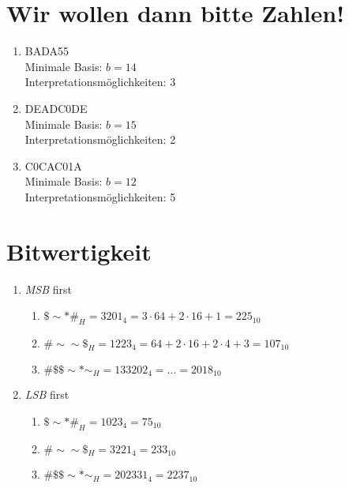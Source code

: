 \documentclass[a4paper]{article}
\begin{document}
\section{Wir wollen dann bitte Zahlen!}
\begin{enumerate}[label=\alph*)]
	\item BADA55 \\
	Minimale Basis:  $b = 14$ \\
	Interpretationsmöglichkeiten: 3


	\item DEADC0DE \\
	Minimale Basis:  $b = 15$ \\
	Interpretationsmöglichkeiten: 2

	\item C0CAC01A \\
	Minimale Basis:  $b = 12$ \\
	Interpretationsmöglichkeiten: 5
\end{enumerate}

\section{Bitwertigkeit}
\begin{enumerate}[label=\alph*)]
    \item \emph{MSB} first
        \begin{enumerate}[label=\Roman*)]
            \item $ \$\sim*\#_H = 3201_4 = 3 \cdot 64 + 2 \cdot 16 + 1 = 225_{10} $

            \item $ \#\sim\sim\$_H = 1223_4 = 64 + 2 \cdot 16 + 2 \cdot 4 + 3 = 107_{10} $

            \item $ \#\$\$\sim*\sim_H = 133202_4 = \dots = 2018_{10} $
        \end{enumerate}

    \item \emph{LSB} first
        \begin{enumerate}[label=\Roman*)]
            \item $ \$\sim*\#_H = 1023_4 = 75_{10} $

            \item $ \#\sim\sim\$_H = 3221_4 = 233_{10} $

            \item $ \#\$\$\sim*\sim_H = 202331_4 = 2237_{10} $
        \end{enumerate}
\end{enumerate}
\end{document}
